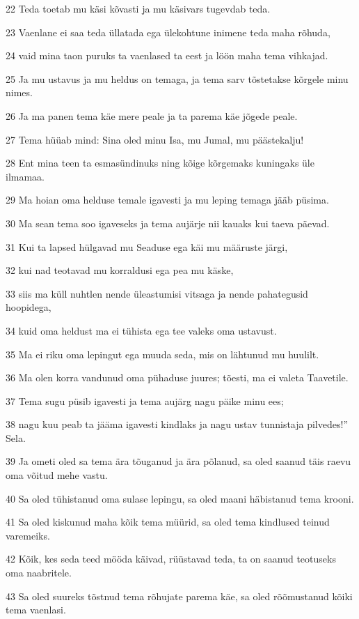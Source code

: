 \par 22 Teda toetab mu käsi kõvasti ja mu käsivars tugevdab teda.
\par 23 Vaenlane ei saa teda üllatada ega ülekohtune inimene teda maha rõhuda,
\par 24 vaid mina taon puruks ta vaenlased ta eest ja löön maha tema vihkajad.
\par 25 Ja mu ustavus ja mu heldus on temaga, ja tema sarv tõstetakse kõrgele minu nimes.
\par 26 Ja ma panen tema käe mere peale ja ta parema käe jõgede peale.
\par 27 Tema hüüab mind: Sina oled minu Isa, mu Jumal, mu päästekalju!
\par 28 Ent mina teen ta esmasündinuks ning kõige kõrgemaks kuningaks üle ilmamaa.
\par 29 Ma hoian oma helduse temale igavesti ja mu leping temaga jääb püsima.
\par 30 Ma sean tema soo igaveseks ja tema aujärje nii kauaks kui taeva päevad.
\par 31 Kui ta lapsed hülgavad mu Seaduse ega käi mu määruste järgi,
\par 32 kui nad teotavad mu korraldusi ega pea mu käske,
\par 33 siis ma küll nuhtlen nende üleastumisi vitsaga ja nende pahategusid hoopidega,
\par 34 kuid oma heldust ma ei tühista ega tee valeks oma ustavust.
\par 35 Ma ei riku oma lepingut ega muuda seda, mis on lähtunud mu huulilt.
\par 36 Ma olen korra vandunud oma pühaduse juures; tõesti, ma ei valeta Taavetile.
\par 37 Tema sugu püsib igavesti ja tema aujärg nagu päike minu ees;
\par 38 nagu kuu peab ta jääma igavesti kindlaks ja nagu ustav tunnistaja pilvedes!” Sela.
\par 39 Ja ometi oled sa tema ära tõuganud ja ära põlanud, sa oled saanud täis raevu oma võitud mehe vastu.
\par 40 Sa oled tühistanud oma sulase lepingu, sa oled maani häbistanud tema krooni.
\par 41 Sa oled kiskunud maha kõik tema müürid, sa oled tema kindlused teinud varemeiks.
\par 42 Kõik, kes seda teed mööda käivad, rüüstavad teda, ta on saanud teotuseks oma naabritele.
\par 43 Sa oled suureks tõstnud tema rõhujate parema käe, sa oled rõõmustanud kõiki tema vaenlasi.
